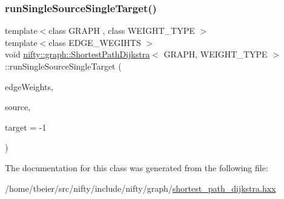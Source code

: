\mbox{\label{classnifty_1_1graph_1_1ShortestPathDijkstra_ab199118e6b805700d5330563401fe39d}} 
\subsubsection{\texorpdfstring{run\+Single\+Source\+Single\+Target()}{runSingleSourceSingleTarget()}}
{\footnotesize\ttfamily template$<$class G\+R\+A\+PH , class W\+E\+I\+G\+H\+T\+\_\+\+T\+Y\+PE $>$ \\
template$<$class E\+D\+G\+E\+\_\+\+W\+E\+G\+I\+H\+TS $>$ \\
void \hyperlink{classnifty_1_1graph_1_1ShortestPathDijkstra}{nifty\+::graph\+::\+Shortest\+Path\+Dijkstra}$<$ G\+R\+A\+PH, W\+E\+I\+G\+H\+T\+\_\+\+T\+Y\+PE $>$\+::run\+Single\+Source\+Single\+Target (\begin{DoxyParamCaption}\item[{const E\+D\+G\+E\+\_\+\+W\+E\+G\+I\+H\+TS \&}]{edge\+Weights,  }\item[{const int64\+\_\+t}]{source,  }\item[{const int64\+\_\+t}]{target = {\ttfamily -\/1} }\end{DoxyParamCaption})\hspace{0.3cm}{\ttfamily [inline]}}



The documentation for this class was generated from the following file\+:\begin{DoxyCompactItemize}
\item 
/home/tbeier/src/nifty/include/nifty/graph/\hyperlink{shortest__path__dijkstra_8hxx}{shortest\+\_\+path\+\_\+dijkstra.\+hxx}\end{DoxyCompactItemize}

